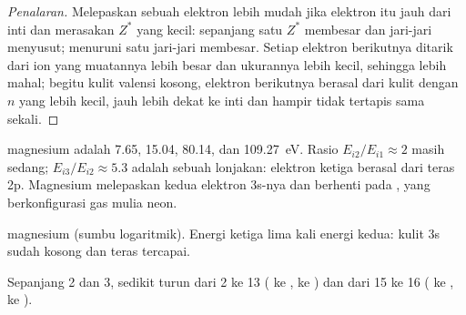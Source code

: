 \begin{proof}[Penalaran]
Melepaskan sebuah elektron lebih mudah jika elektron itu jauh dari inti
dan merasakan $Z^{*}$ yang kecil: sepanjang satu  $Z^{*}$ membesar
dan jari-jari menyusut; menuruni satu  jari-jari membesar. Setiap
elektron berikutnya ditarik dari ion yang muatannya lebih besar dan
ukurannya lebih kecil, sehingga lebih mahal; begitu kulit valensi kosong,
elektron berikutnya berasal dari kulit dengan $n$ yang lebih kecil, jauh
lebih dekat ke inti dan hampir tidak tertapis sama sekali.
\end{proof}

\begin{example}[Magnesium]\label{ex:b1:periodicity:magnesium}
 magnesium adalah 7.65, 15.04, 80.14, dan
\qty{109.27}{eV}. Rasio $E_{i2}/E_{i1} \approx 2$ masih sedang;
$E_{i3}/E_{i2} \approx 5.3$ adalah sebuah lonjakan: elektron ketiga
berasal dari teras 2p. Magnesium melepaskan kedua elektron 3s-nya dan
berhenti pada , yang berkonfigurasi gas mulia neon.
\end{example}

\begin{omfigure}

{\small {} magnesium (sumbu logaritmik).
Energi ketiga lima kali energi kedua: kulit 3s sudah kosong dan teras
tercapai.}
\end{omfigure}

\begin{proposition}\label{prop:b1:periodicity:ie-anomalies}
Sepanjang  2 dan 3,  sedikit turun dari
 2 ke  13 ( ke ,  ke ) dan
dari  15 ke  16 ( ke ,  ke ).
\end{proposition}

